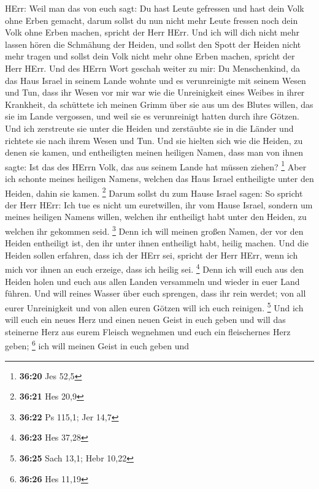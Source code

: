 HErr: Weil man das von euch sagt: Du hast Leute gefressen und hast dein
Volk ohne Erben gemacht,  darum sollst du nun nicht mehr
Leute fressen noch dein Volk ohne Erben machen, spricht der Herr HErr.
 Und ich will dich nicht mehr lassen hören die Schmähung
der Heiden, und sollst den Spott der Heiden nicht mehr tragen und sollst
dein Volk nicht mehr ohne Erben machen, spricht der Herr HErr.
 Und des HErrn Wort geschah weiter zu mir:
 Du Menschenkind, da das Haus Israel in seinem Lande
wohnte und es verunreinigte mit seinem Wesen und Tun, dass ihr Wesen vor
mir war wie die Unreinigkeit eines Weibes in ihrer Krankheit,
 da schüttete ich meinen Grimm über sie aus um des Blutes
willen, das sie im Lande vergossen, und weil sie es verunreinigt hatten
durch ihre Götzen.  Und ich zerstreute sie unter die
Heiden und zerstäubte sie in die Länder und richtete sie nach ihrem
Wesen und Tun.  Und sie hielten sich wie die Heiden, zu
denen sie kamen, und entheiligten meinen heiligen Namen, dass man von
ihnen sagte: Ist das des HErrn Volk, das aus seinem Lande hat müssen
ziehen? \footnote{\textbf{36:20} Jes 52,5}  Aber ich
schonte meines heiligen Namens, welchen das Haus Israel entheiligte
unter den Heiden, dahin sie kamen. \footnote{\textbf{36:21} Hes 20,9}
 Darum sollst du zum Hause Israel sagen: So spricht der
Herr HErr: Ich tue es nicht um euretwillen, ihr vom Hause Israel,
sondern um meines heiligen Namens willen, welchen ihr entheiligt habt
unter den Heiden, zu welchen ihr gekommen seid. \footnote{\textbf{36:22}
  Ps 115,1; Jer 14,7}  Denn ich will meinen großen Namen,
der vor den Heiden entheiligt ist, den ihr unter ihnen entheiligt habt,
heilig machen. Und die Heiden sollen erfahren, dass ich der HErr sei,
spricht der Herr HErr, wenn ich mich vor ihnen an euch erzeige, dass ich
heilig sei. \footnote{\textbf{36:23} Hes 37,28}  Denn ich
will euch aus den Heiden holen und euch aus allen Landen versammeln und
wieder in euer Land führen.  Und will reines Wasser über
euch sprengen, dass ihr rein werdet; von all eurer Unreinigkeit und von
allen euren Götzen will ich euch reinigen. \footnote{\textbf{36:25} Sach
  13,1; Hebr 10,22}  Und ich will euch ein neues Herz und
einen neuen Geist in euch geben und will das steinerne Herz aus eurem
Fleisch wegnehmen und euch ein fleischernes Herz geben; \footnote{\textbf{36:26}
  Hes 11,19}  ich will meinen Geist in euch geben und
